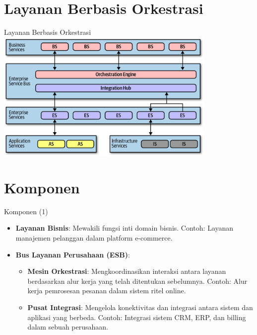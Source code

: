 \documentclass[aspectratio=169, table]{beamer}
\begin{document}
   \section{Layanan Berbasis Orkestrasi}
   \begin{frame}{Layanan Berbasis Orkestrasi}
       \vspace{30pt}
       \centering
       \includegraphics[width=0.8\textwidth]{../../images/orchestration-example}
   \end{frame}

   \section{Komponen}
   \begin{frame}{Komponen (1)}
       \begin{itemize}
           \item \textbf{Layanan Bisnis}: Mewakili fungsi inti domain bisnis. Contoh: Layanan manajemen pelanggan dalam platform e-commerce.
           \item \textbf{Bus Layanan Perusahaan (ESB)}:
           \begin{itemize}
               \item \textbf{Mesin Orkestrasi}: Mengkoordinasikan interaksi antara layanan berdasarkan alur kerja yang telah ditentukan sebelumnya. Contoh: Alur kerja pemrosesan pesanan dalam sistem ritel online.
               \item \textbf{Pusat Integrasi}: Mengelola konektivitas dan integrasi antara sistem dan aplikasi yang berbeda. Contoh: Integrasi sistem CRM, ERP, dan billing dalam sebuah perusahaan.
           \end{itemize}
       \end{itemize}
   \end{frame}
\end{document}
